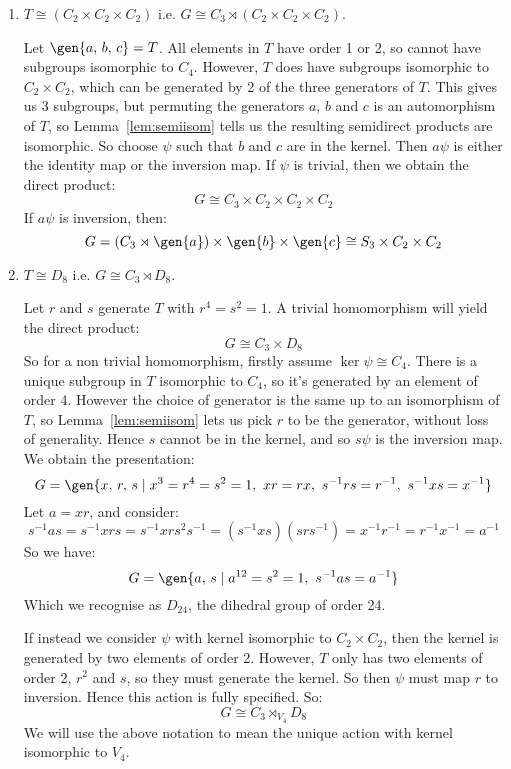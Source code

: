 \begin{enumerate}
    \item \(T \cong (C_2 \times C_2 \times C_2)\) i.e. \(G \cong C_3 \rtimes (C_2 \times C_2 \times C_2)\).

        Let \(\gen{a,\,b,\,c} = T\).
        All elements in \(T\) have order 1 or 2, so cannot have subgroups isomorphic to \(C_4\).
        However, \(T\) does have subgroups isomorphic to \(C_2 \times C_2\), which can be generated by 2 of the three
        generators of \(T\).
        This gives us 3 subgroups, but permuting the generators \(a,\,b\) and \(c\) is an automorphism of \(T\), so
        Lemma~\ref{lem:semiisom} tells us the resulting semidirect products are isomorphic.
        So choose \(\psi\) such that \(b\) and \(c\) are in the kernel.
        Then \(a\psi\) is either the identity map or the inversion map.
        If \(\psi\) is trivial, then we obtain the direct product:
        \[G \cong C_3 \times C_2 \times C_2 \times C_2\]
        If \(a\psi\) is inversion, then:
        \[G = (C_3 \rtimes \gen{a}) \times \gen{b} \times \gen{c} \cong S_3 \times C_2 \times C_2\]


    \item \(T \cong D_8\) i.e. \(G \cong C_3 \rtimes D_8\).

        Let \(r\) and \(s\) generate \(T\) with \(r^4 = s^2 = 1\).
        A trivial homomorphism will yield the direct product:
        \[G \cong C_3 \times D_8\]
        So for a non trivial homomorphism, firstly assume \(\ker\psi \cong C_4\).
        There is a unique subgroup in \(T\) isomorphic to \(C_4\), so it's generated by an element of order 4.
        However the choice of generator is the same up to an isomorphism of \(T\), so Lemma~\ref{lem:semiisom} lets us
        pick \(r\) to be the generator, without loss of generality.
        Hence \(s\) cannot be in the kernel, and so \(s\psi\) is the inversion map.
        We obtain the presentation:
        \[G = \gen{x,\,r,\,s \mid x^3 = r^4 = s^2 = 1,\ xr = rx,\ s^{-1}rs = r^{-1},\ s^{-1}xs = x^{-1}}\]
        Let \(a = xr\), and consider:
        \[s^{-1}as = s^{-1}xrs = s^{-1}xrs^2 s^{-1} = (s^{-1}xs)(srs^{-1}) = x^{-1}r^{-1} = r^{-1}x^{-1} = a^{-1}\]
        So we have:
        \[G = \gen{a,\,s \mid a^{12} = s^2 = 1,\ s^{-1}as = a^{-1}}\]
        Which we recognise as \(D_{24}\), the dihedral group of order 24.

        If instead we consider \(\psi\) with kernel isomorphic to \(C_2 \times C_2\), then the kernel is generated by
        two elements of order 2.
        However, \(T\) only has two elements of order 2, \(r^2\) and \(s\), so they must generate the kernel.
        So then \(\psi\) must map \(r\) to inversion.
        Hence this action is fully specified.
        So:
        \[G \cong C_3 \rtimes_{V_4} D_8\]
        We will use the above notation to mean the unique action with kernel isomorphic to \(V_4\).


\end{enumerate}
